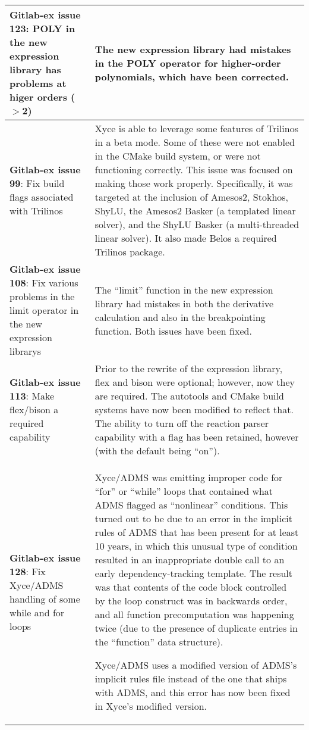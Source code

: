 {\begin{longtable}[h] {>{\raggedright\small}m{2in}|>{\raggedright\let\\\tabularnewline\small}m{3.5in}}
\textbf{Gitlab-ex issue 123}:  POLY in the new expression library has problems 
  at higer orders ($>$2) & The new expression library had mistakes in the POLY 
  operator for higher-order polynomials, which have been corrected.  
\\ \hline

\textbf{Gitlab-ex issue 99}:  Fix build flags associated with Trilinos &
Xyce is able to leverage some features of Trilinos in a beta mode. Some of
these were not enabled in the CMake build system, or were not functioning
correctly. This issue was focused on making those work properly. Specifically,
it was targeted at the inclusion of Amesos2, Stokhos, ShyLU, the Amesos2 Basker
(a templated linear solver), and the ShyLU Basker (a multi-threaded linear
solver). It also made Belos a required Trilinos package.
\\ \hline

\textbf{Gitlab-ex issue 108}:  Fix various problems in the limit operator in 
the new expression librarys &
The ``limit'' function in the new expression library had mistakes in both the 
derivative calculation and also in the breakpointing function.  Both issues 
have been fixed.
\\ \hline

\textbf{Gitlab-ex issue 113}:  Make flex/bison a required capability &
Prior to the rewrite of the expression library, flex and bison were optional;
however, now they are required. The autotools and CMake build systems have now
been modified to reflect that. The ability to turn off the reaction parser
capability with a flag has been retained, however (with the default being
``on'').
\\ \hline

\textbf{Gitlab-ex issue 128}: Fix Xyce/ADMS handling of some while and for loops &
Xyce/ADMS was emitting improper code for ``for'' or ``while'' loops
that contained what ADMS flagged as ``nonlinear'' conditions.  This
turned out to be due to an error in the implicit rules of ADMS that
has been present for at least 10 years, in which this unusual type of
condition resulted in an inappropriate double call to an early
dependency-tracking template.  The result was that contents of the
code block controlled by the loop construct was in backwards order,
and all function precomputation was happening twice (due to the
presence of duplicate entries in the ``function'' data structure).

Xyce/ADMS uses a modified version of ADMS's implicit rules file
instead of the one that ships with ADMS, and this error has now been
fixed in Xyce's modified version.


\end{longtable}}
